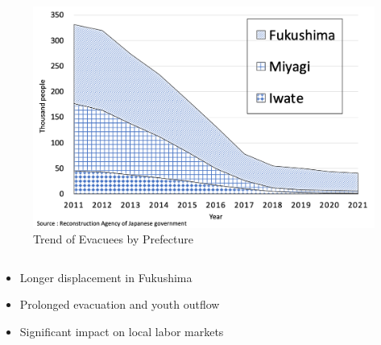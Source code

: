 \documentclass[serif, aspectratio=169]{beamer}
\begin{document}
\begin{frame}[label=evacuees_main]
\begin{columns}[T, onlytextwidth]
        \begin{column}{0.485\textwidth}
            \begin{figure}[ht]
                \centering
                \includegraphics[width=\textwidth]{evacuation2.png}
                \caption{Trend of Evacuees by Prefecture}
                \label{fig:evacuees_trend}
            \end{figure}
        \end{column}
    \end{columns}
    
\begin{column}{0.49\textwidth}
    \raggedright
    \vspace{-2.5cm}
    \hspace{-1.1cm}
    \small{
        \begin{itemize}
            \item Longer displacement in Fukushima
            \item Prolonged evacuation and youth outflow
            \item Significant impact on local labor markets

        \end{itemize}
    }
\end{column}
\vspace{-0.5cm}
\end{frame}

\end{document}
